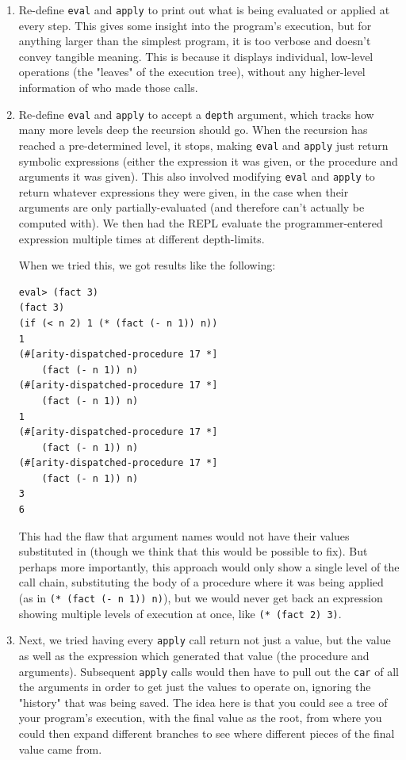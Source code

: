 \documentclass[10pt,journal,compsoc]{IEEEtran}
\begin{document}
		\begin{enumerate}
		\item Re-define \lstinline{eval} and \lstinline{apply} to print out what is being evaluated or applied at every step. This gives some insight into the program's execution, but for anything larger than the simplest program, it is too verbose and doesn't convey tangible meaning. This is because it displays individual, low-level operations (the "leaves" of the execution tree), without any higher-level information of who made those calls.

		\item Re-define \lstinline{eval} and \lstinline{apply} to accept a \lstinline{depth} argument, which tracks how many more levels deep the recursion should go. When the recursion has reached a pre-determined level, it stops, making \lstinline{eval} and \lstinline{apply} just return symbolic expressions (either the expression it was given, or the procedure and arguments it was given). This also involved modifying \lstinline{eval} and \lstinline{apply} to return whatever expressions they were given, in the case when their arguments are only partially-evaluated (and therefore can't actually be computed with). We then had the REPL evaluate the programmer-entered expression multiple times at different depth-limits.

		When we tried this, we got results like the following:

\begin{lstlisting}[frame=single]
eval> (fact 3)
(fact 3)
(if (< n 2) 1 (* (fact (- n 1)) n))
1
(#[arity-dispatched-procedure 17 *]
    (fact (- n 1)) n)
(#[arity-dispatched-procedure 17 *]
    (fact (- n 1)) n)
1
(#[arity-dispatched-procedure 17 *]
    (fact (- n 1)) n)
(#[arity-dispatched-procedure 17 *]
    (fact (- n 1)) n)
3
6
\end{lstlisting}

This had the flaw that argument names would not have their values substituted in (though we think that this would be possible to fix). But perhaps more importantly, this approach would only show a single level of the call chain, substituting the body of a procedure where it was being applied (as in \lstinline{(* (fact (- n 1)) n)}), but we would never get back an expression showing multiple levels of execution at once, like \lstinline{(* (fact 2) 3)}.

		\item Next, we tried having every \lstinline{apply} call return not just a value, but the value as well as the expression which generated that value (the procedure and arguments). Subsequent \lstinline{apply} calls would then have to pull out the \lstinline{car} of all the arguments in order to get just the values to operate on, ignoring the "history" that was being saved. The idea here is that you could see a tree of your program's execution, with the final value as the root, from where you could then expand different branches to see where different pieces of the final value came from. 


\end{enumerate}
\end{document}

